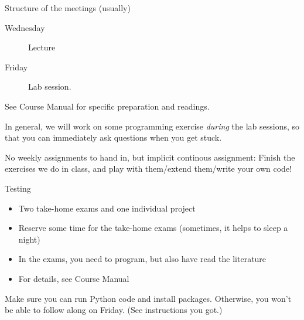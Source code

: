 \documentclass[compress]{beamer}
\begin{document}
\begin{frame}{Structure of the meetings (usually)}
	\begin{description}
		\item[Wednesday] Lecture
		\item[Friday]Lab session.
	\end{description}
See Course Manual for specific preparation and readings.

In general, we will work on some programming exercise \emph{during} the lab sessions, so that you can immediately ask questions when you get stuck.

No weekly assignments to hand in, but implicit continous assignment: Finish the exercises we do in class, and play with them/extend them/write your own code!
\end{frame}

\begin{frame}{Testing}
\begin{itemize}
	\item Two take-home exams and one individual project
	\item Reserve some time for the take-home exams (sometimes, it helps to sleep a night)
	\item In the exams, you need to program, but also have read the literature
	\item For details, see Course Manual
\end{itemize}
\end{frame}





\begin{frame}[standout]
	Make sure you can run Python code and install packages. Otherwise, you won't be able to follow along on Friday. (See instructions you got.)
\end{frame}

\appendix
\begin{frame}
	\printbibliography
\end{frame}
\end{document}
